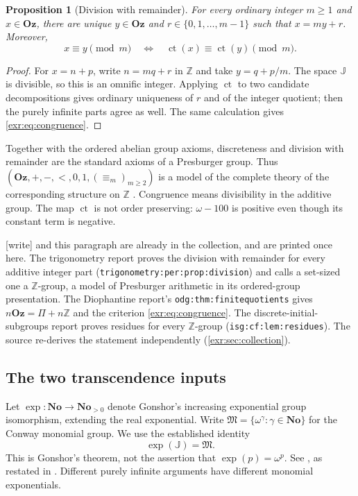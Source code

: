 \documentclass[11pt,letterpaper]{article}
\numberwithin{equation}{section}
\newtheorem{proposition}[proposition]{Proposition}
\theoremstyle{definition}
\theoremstyle{remark}
\newcommand{\No}{\mathbf{No}}
\newcommand{\Oz}{\mathbf{Oz}}
\newcommand{\Z}{\mathbb Z}
\newcommand{\J}{\mathbb J}
\newcommand{\M}{\mathfrak M}
\newcommand{\ct}{\operatorname{ct}}
\newcommand{\lbl}[1]{\nolinkurl{#1}}%
\newcommand{\wtag}{\textup{[write]}}%
\begin{document}
\begin{proposition}[Division with remainder]\label{exr:prop:division}
For every ordinary integer $m\geq1$ and $x\in\Oz$, there are unique $y\in\Oz$ and
$r\in\{0,1,\ldots,m-1\}$ such that $x=my+r$. Moreover,
\begin{equation}\label{exr:eq:congruence}
 x\equiv y\pmod m\quad\Longleftrightarrow\quad
 \ct(x)\equiv\ct(y)\pmod m.
\end{equation}
\end{proposition}
\begin{proof}
For $x=n+p$, write $n=mq+r$ in $\Z$ and take $y=q+p/m$. The space $\J$ is divisible,
so this is an omnific integer. Applying $\ct$ to two candidate decompositions gives
ordinary uniqueness of $r$ and of the integer quotient; then the purely infinite
parts agree as well. The same calculation gives \eqref{exr:eq:congruence}.
\end{proof}

Together with the ordered abelian group axioms, discreteness and division with
remainder are the standard axioms of a Presburger group. Thus $(\Oz,+,-,<,0,1,
(\equiv_m)_{m\geq2})$ is a model of the complete theory of the corresponding
structure on $\Z$ \cite{cluckers}. Congruence means divisibility in the additive
group. The map $\ct$ is not order preserving: $\omega-100$ is positive even though
its constant term is negative.

\wtag{}  and this paragraph are already in the
collection, and are printed once here. The trigonometry report proves the
division with remainder for every additive integer part
(\lbl{trigonometry:per:prop:division}) and calls a set-sized one a
$\Z$-group, a model of Presburger arithmetic in its ordered-group
presentation. The Diophantine report's \lbl{odg:thm:finitequotients} gives
$n\Oz=\Pi+n\Z$ and the criterion \eqref{exr:eq:congruence}. The
discrete-initial-subgroups report proves residues for every $\Z$-group
(\lbl{isg:cf:lem:residues}). The source re-derives the statement
independently (\cref{exr:sec:collection}).

\subsection{The two transcendence inputs}
Let $\exp:\No\to\No_{>0}$ denote Gonshor's increasing exponential group
isomorphism, extending the real exponential. Write
$\M=\{\omega^\gamma:\gamma\in\No\}$ for the Conway monomial group.
We use the established identity
\begin{equation}\label{exr:eq:Gonshor} \exp(\J)=\M. \end{equation}
This is Gonshor's theorem, not the assertion that $\exp(p)=\omega^p$.
See \cite[Theorems~10.8--10.13]{gonshor}, as restated in
\cite[Theorem~2.16]{mantova}. Different purely infinite arguments have different
monomial exponentials.
\end{document}
